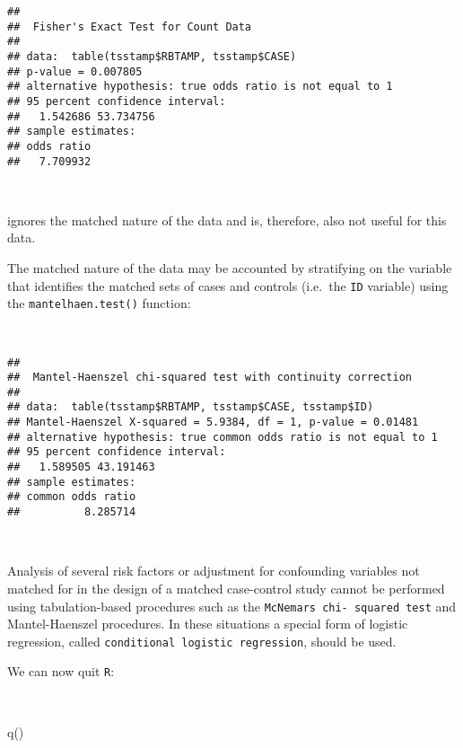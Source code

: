 \documentclass[
  12pt,
  a4paper]{book}
\newenvironment{Shaded}{\begin{snugshade}}{\end{snugshade}}
\newcommand{\FunctionTok}[1]{\textcolor[rgb]{0.00,0.00,0.00}{#1}}
\newcommand{\NormalTok}[1]{#1}
\newcommand{\SpecialCharTok}[1]{\textcolor[rgb]{0.00,0.00,0.00}{#1}}
\begin{document}
\begin{verbatim}
## 
##  Fisher's Exact Test for Count Data
## 
## data:  table(tsstamp$RBTAMP, tsstamp$CASE)
## p-value = 0.007805
## alternative hypothesis: true odds ratio is not equal to 1
## 95 percent confidence interval:
##   1.542686 53.734756
## sample estimates:
## odds ratio 
##   7.709932
\end{verbatim}

~

ignores the matched nature of the data and is, therefore, also not useful for this data.

The matched nature of the data may be accounted by stratifying on the variable that identifies the matched sets
of cases and controls (i.e.~the \texttt{ID} variable) using the \texttt{mantelhaen.test()} function:

~

\begin{Shaded}
\end{Shaded}

\begin{verbatim}
## 
##  Mantel-Haenszel chi-squared test with continuity correction
## 
## data:  table(tsstamp$RBTAMP, tsstamp$CASE, tsstamp$ID)
## Mantel-Haenszel X-squared = 5.9384, df = 1, p-value = 0.01481
## alternative hypothesis: true common odds ratio is not equal to 1
## 95 percent confidence interval:
##   1.589505 43.191463
## sample estimates:
## common odds ratio 
##          8.285714
\end{verbatim}

~

Analysis of several risk factors or adjustment for confounding variables not matched for in the design of a matched case-control study cannot be performed using tabulation-based procedures such as the \texttt{McNemar\textquotesingle{}s\ chi-\ squared\ test} and Mantel-Haenszel procedures. In these situations a special form of logistic regression, called \texttt{conditional\ logistic\ regression}, should be used.

We can now quit \texttt{R}:

~

\begin{Shaded}
\begin{Highlighting}[]
\FunctionTok{q}\NormalTok{()}
\end{Highlighting}
\end{Shaded}
\end{document}

